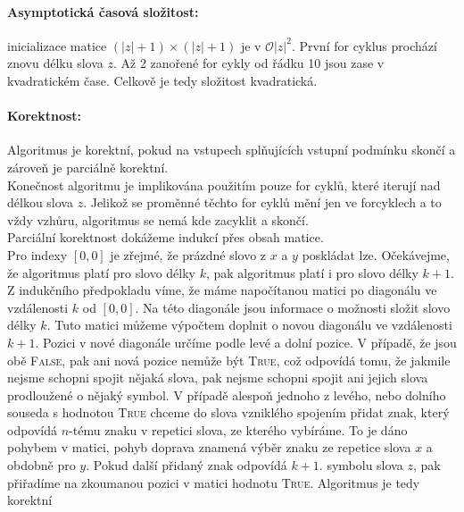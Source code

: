 \documentclass[12pt]{iv003}
\begin{document}
\paragraph{Asymptotická časová složitost:} inicializace matice $(|z| + 1) \times (|z| + 1)$ je v $\mathcal{O}|z|^{2}$. První for cyklus prochází znovu délku slova $z$. Až 2 zanořené for cykly od řádku 10 jsou zase v kvadratickém čase. Celkově je tedy složitost kvadratická.
\paragraph{Korektnost:} Algoritmus je korektní, pokud na vstupech splňujících vstupní podmínku skončí a zároveň je parciálně korektní.\\
Konečnost algoritmu je implikována použitím pouze for cyklů, které iterují nad délkou slova $z$. Jelikož se proměnné těchto for cyklů mění jen ve forcyklech a to vždy vzhůru, algoritmus se nemá kde zacyklit a skončí.\\
Parciální korektnost dokážeme indukcí přes obsah matice.\\
Pro indexy $[0,0]$ je zřejmé, že prázdné slovo z $x$ a $y$ poskládat lze.
Očekávejme, že algoritmus platí pro slovo délky $k$, pak algoritmus platí i pro slovo délky $k+1$. Z indukčního předpokladu víme, že máme napočítanou matici po diagonálu ve vzdálenosti $k$ od $[0,0]$. Na této diagonále jsou informace o možnosti složit slovo délky $k$. Tuto matici můžeme výpočtem doplnit o novou diagonálu ve vzdálenosti $k+1$. Pozici v nové diagonále určíme podle levé a dolní pozice. V případě, že jsou obě \textsc{False}, pak ani nová pozice nemůže být \textsc{True}, což odpovídá tomu, že jakmile nejsme schopni spojit nějaká slova, pak nejsme schopni spojit ani jejich slova prodloužené o nějaký symbol. V případě alespoň jednoho z levého, nebo dolního souseda s hodnotou \textsc{True} chceme do slova vzniklého spojením přidat znak, který odpovídá $n$-tému znaku v repetici slova, ze kterého vybíráme. To je dáno pohybem v matici, pohyb doprava znamená výběr znaku ze repetice slova $x$ a obdobně pro $y$. Pokud další přidaný znak odpovídá $k+1$. symbolu slova $z$, pak přiřadíme na zkoumanou pozici v matici hodnotu \textsc{True}. Algoritmus je tedy korektní
\end{document}
